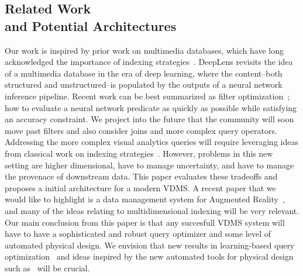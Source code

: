 \subsection{Related Work \\ and Potential Architectures}
Our work is inspired by prior work on multimedia databases, which have long acknowledged the importance of indexing strategies~\cite{yoshitaka1999survey, faloutsos2012searching}.
\textsf{DeepLens} revisits the idea of a multimedia database in the era of deep learning, where the content--both structured and unstructured--is populated by the outputs of a neural network inference pipeline.
Recent work can be best summarized as filter optimization~\cite{kang2017noscope, zhang2018ffs, anderson2018physical, jiang2018chameleon}; how to evaluate a neural network predicate as quickly as possible while satisfying an accuracy constraint.
We project into the future that the community will soon move past filters and also consider joins and more complex query operators.
Addressing the more complex visual analytics queries will require leveraging ideas from classical work on indexing strategies~\cite{faloutsos2012searching}.
However, problems in this new setting are higher dimensional, have to manage uncertainty, and have to manage the provenace of downstream data. 
This paper evaluates these tradeoffs and proposes a initial architecture for a modern VDMS.
A recent paper that we would like to highlight is a data management system for Augmented Reality~\cite{haynes2018lightdb}, and many of the ideas relating to multidimensional indexing will be very relevant.
Our main conclusion from this paper is that any succesfull VDMS system will have to have a sophisticated and robust query optimizer and some level of automated physical design. 
We envision that new results in learning-based query optimization~\cite{kaftan2018cuttlefish,krishnan2018deeprljoins} and ideas inspired by the new automated tools for physical design such as~\cite{sharma2018case,pavlo2017self} will be crucial.











